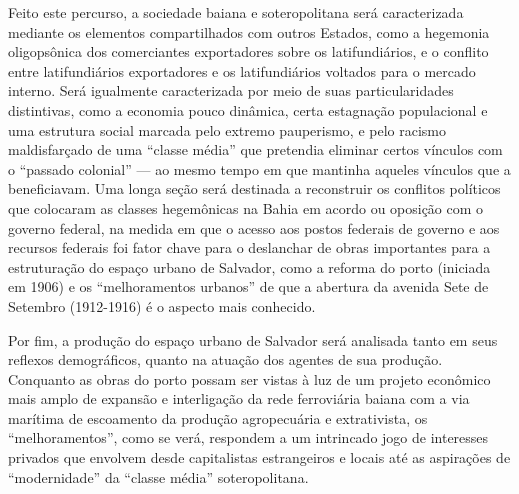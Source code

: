 Feito este percurso, a sociedade baiana e soteropolitana será caracterizada mediante os elementos compartilhados com outros Estados, como a hegemonia oligopsônica dos comerciantes exportadores sobre os latifundiários, e o conflito entre latifundiários exportadores e os latifundiários voltados para o mercado interno. Será igualmente caracterizada por meio de suas particularidades distintivas, como a economia pouco dinâmica, certa estagnação populacional e uma estrutura social marcada pelo extremo pauperismo, e pelo racismo maldisfarçado de uma ``classe média'' que pretendia eliminar certos vínculos com o ``passado colonial'' --- ao mesmo tempo em que mantinha aqueles vínculos que a beneficiavam. Uma longa seção será destinada a reconstruir os conflitos políticos que colocaram as classes hegemônicas na Bahia em acordo ou oposição com o governo federal, na medida em que o acesso aos postos federais de governo e aos recursos federais foi fator chave para o deslanchar de obras importantes para a estruturação do espaço urbano de Salvador, como a reforma do porto (iniciada em 1906) e os ``melhoramentos urbanos'' de que a abertura da avenida Sete de Setembro (1912-1916) é o aspecto mais conhecido.

Por fim, a produção do espaço urbano de Salvador será analisada tanto em seus reflexos demográficos, quanto na atuação dos agentes de sua produção. Conquanto as obras do porto possam ser vistas à luz de um projeto econômico mais amplo de expansão e interligação da rede ferroviária baiana com a via marítima de escoamento da produção agropecuária e extrativista, os ``melhoramentos'', como se verá, respondem a um intrincado jogo de interesses privados que envolvem desde capitalistas estrangeiros e locais até as aspirações de ``modernidade'' da ``classe média'' soteropolitana.

